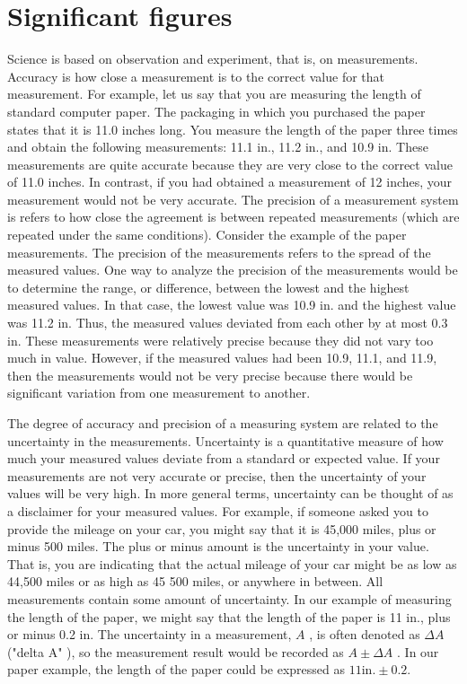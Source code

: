 \section{Significant figures}\label{sec:sig-figs}
Science is based on observation and experiment, that is, on measurements. Accuracy is how close a measurement is to the correct value for that measurement. For example, let us say that you are measuring the length of standard computer paper. The packaging in which you purchased the paper states that it is 11.0 inches long. You measure the length of the paper three times and obtain the following measurements: 11.1 in., 11.2 in., and 10.9 in. These measurements are quite accurate because they are very close to the correct value of 11.0 inches. In contrast, if you had obtained a measurement of 12 inches, your measurement would not be very accurate.
The precision of a measurement system is refers to how close the agreement is between repeated measurements (which are repeated under the
same conditions). Consider the example of the paper measurements. The precision of the measurements refers to the spread of the measured
values. One way to analyze the precision of the measurements would be to determine the range, or difference, between the lowest and the highest measured values. In that case, the lowest value was 10.9 in. and the highest value was 11.2 in. Thus, the measured values deviated from each other by at most 0.3 in. These measurements were relatively precise because they did not vary too much in value. However, if the measured values had been 10.9, 11.1, and 11.9, then the measurements would not be very precise because there would be significant variation from one measurement to another.

The degree of accuracy and precision of a measuring system are related to the uncertainty in the measurements. Uncertainty is a quantitative measure of how much your measured values deviate from a standard or expected value. If your measurements are not very accurate or precise, then the uncertainty of your values will be very high. In more general terms, uncertainty can be thought of as a disclaimer for your measured values. For example, if someone asked you to provide the mileage on your car, you might say that it is 45,000 miles, plus or minus 500 miles. The plus or minus amount is the uncertainty in your value. That is, you are indicating that the actual mileage of your car might be as low as 44,500 miles or as high as 45 500 miles, or anywhere in between. All measurements contain some amount of uncertainty. In our example of measuring the length of the paper, we might say that the length of the paper is 11 in., plus or minus 0.2 in. The uncertainty in a measurement, $A$ , is often denoted as $\Delta A$ ("delta A" ),
so the measurement result would be recorded as $A \pm \Delta A$ . In our paper example, the length of the paper could be expressed as $11 \text{in}. \pm 0.2$.

